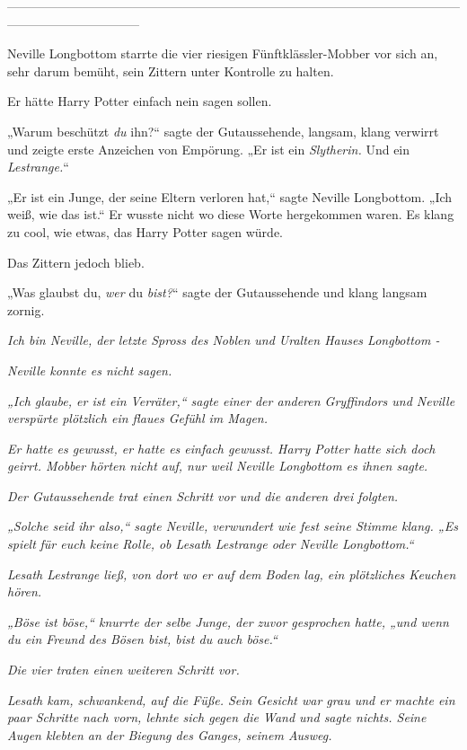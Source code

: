 {--------------------------------------------------------------------------------------------------------------------------------------------

\hfill\break Neville Longbottom starrte die vier riesigen Fünftklässler-Mobber vor sich an, sehr darum bemüht, sein Zittern unter Kontrolle zu halten.

Er hätte Harry Potter einfach nein sagen sollen.

„Warum beschützt \emph{du} ihn?“ sagte der Gutaussehende, langsam, klang verwirrt und zeigte erste Anzeichen von Empörung. „Er ist ein \emph{Slytherin.} Und ein \emph{Lestrange.}“

„Er ist ein Junge, der seine Eltern verloren hat,“ sagte Neville Longbottom. „Ich weiß, wie das ist.“ Er wusste nicht wo diese Worte hergekommen waren. Es klang zu cool, wie etwas, das Harry Potter sagen würde.

Das Zittern jedoch blieb.

„Was glaubst du, \emph{wer} du \emph{bist?}“ sagte der Gutaussehende und klang langsam zornig.

\emph{Ich bin Neville, der letzte Spross des Noblen und Uralten Hauses Longbottom -}

\emph{Neville konnte es nicht sagen.}

\emph{„Ich glaube, er ist ein} \emph{\emph{Verräter,}“ sagte einer der anderen Gryffindors und Neville verspürte plötzlich ein flaues Gefühl im Magen.}

\emph{Er hatte es gewusst, er hatte es einfach gewusst. Harry Potter hatte sich doch geirrt. Mobber hörten nicht auf, nur weil Neville Longbottom es ihnen sagte.}

\emph{Der Gutaussehende trat einen Schritt vor und die anderen drei folgten.}

\emph{„Solche seid ihr also,“ sagte Neville, verwundert wie fest seine Stimme klang. „Es spielt} \emph{für euch keine Rolle, ob Lesath Lestrange oder Neville Longbottom.“}

\emph{Lesath Lestrange ließ, von dort wo er auf dem Boden lag, ein plötzliches Keuchen hören.}

\emph{„Böse ist böse,“ knurrte der selbe Junge, der zuvor gesprochen hatte, „und wenn du ein Freund des Bösen bist, bist du auch böse.“}

\emph{Die vier traten einen weiteren Schritt vor.}

\emph{Lesath kam, schwankend, auf die Füße. Sein Gesicht war grau und er machte ein paar Schritte nach vorn, lehnte sich gegen die Wand und sagte nichts. Seine Augen klebten an der Biegung des Ganges, seinem Ausweg.}

}
